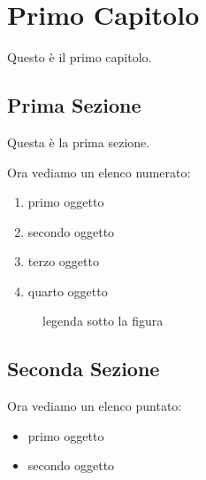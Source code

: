 \documentclass[12pt,a4paper,openright,twoside]{report}
\begin{document}
    \chapter{Primo Capitolo}                %
    \lhead[\fancyplain{}{\bfseries\thepage}]{\fancyplain{}{\bfseries\rightmark}}
    Questo \`e il primo capitolo.
    \section{Prima Sezione}                 %
    Questa \`e la prima sezione.

    Ora vediamo un elenco numerato:         %
    \begin{enumerate}
        \item primo oggetto
        \item secondo oggetto
        \item terzo oggetto
        \item quarto oggetto
    \end{enumerate}

    \begin{figure}[h]                       %
        \begin{center}                          %
            \caption[legenda elenco figure]{legenda sotto la figura}\label{fig:prima}
        \end{center}
    \end{figure}

    \section{Seconda Sezione}
    Ora vediamo un elenco puntato:
    \begin{itemize}                         %
        \item primo oggetto
        \item secondo oggetto
    \end{itemize}
\end{document}
